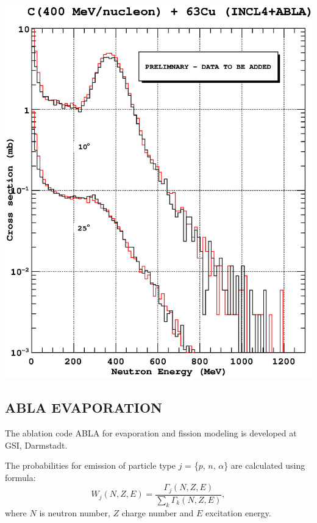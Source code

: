 \documentclass[20pt]{article}
\newenvironment{textbox}
{\begin{lrbox}{\dummybox}\begin{minipage}{0.9\columnwidth}}
{\end{minipage}\end{lrbox}\raisebox{-\depth}{\psshadowbox[framesep=1em,framearc=.1,shadow=true]{\usebox{\dummybox}}}\vspace{0.005\textheight}}
\begin{document}
\begin{center}
\begin{multicols}{3}
\begin{textbox}
{\begin{center}
\includegraphics[scale=0.6,angle=0]{images/carbonCopperLin.eps}
\end{center}
}
\end{textbox}

\begin{textbox}
\section*{{\Huge {\sf ABLA EVAPORATION}}}
{\color{udsect}
The ablation code {\sf ABLA} \cite{abla} for evaporation and fission modeling is developed at GSI, Darmstadt.
\vskip0.5cm

The probabilities for emission of particle type $j$ = \{$p$, $n$, $\alpha$\}
are calculated using formula:
\begin{equation}
W_j(N,Z,E) = \frac{\Gamma_j(N,Z,E)}{\sum_k\Gamma_k(N,Z,E)},
\label{eqn:probabilities}
\end{equation}
where $N$ is neutron
number, $Z$ charge number and $E$ excitation energy.
\vskip0.5cm

}
\end{textbox}
\end{multicols}
\end{center}
\end{document}
